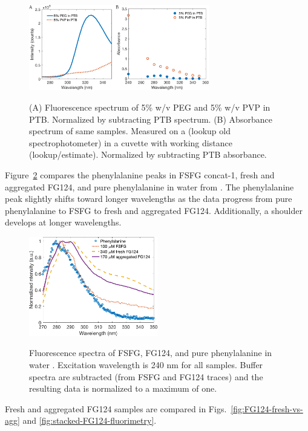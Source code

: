 \begin{figure}
\caption[Fluorescence and absorbance of crowders.]{(A) Fluorescence spectrum of 5\% w/v PEG and 5\% w/v PVP in PTB.  Normalized by subtracting PTB spectrum.  (B) Absorbance spectrum of same samples.  Measured on a (lookup old spectrophotometer) in a cuvette with working distance (lookup/estimate).  Normalized by subtracting PTB absorbance.\\}
\centering
\includegraphics[width=0.7\textwidth]{figs/ch05/crowder-properties}
\label{fig:crowder-prop}
\end{figure}

Figure~\ref{fig:phe-comparison} compares the phenylalanine peaks in FSFG concat-1, fresh and aggregated FG124, and pure phenylalanine in water from \cite{prahl95}.  The phenylalanine peak slightly shifts toward longer wavelengths as the data progress from pure  phenylalanine to FSFG to fresh and aggregated FG124.  Additionally, a shoulder develops at longer wavelengths.

\begin{figure}
\caption{Fluorescence spectra of FSFG, FG124, and pure phenylalanine in water \cite{prahl95}. Excitation wavelength is 240 nm for all samples. Buffer spectra are subtracted (from FSFG and FG124 traces) and the resulting data is normalized to a maximum of one. \\}
\centering
\includegraphics[width=0.5\textwidth]{figs/ch05/phe-comparison.pdf}
\label{fig:phe-comparison}
\end{figure}

Fresh and aggregated FG124 samples are compared in Figs.~\ref{fig:FG124-fresh-vs-agg} and \ref{fig:stacked-FG124-fluorimetry}.

